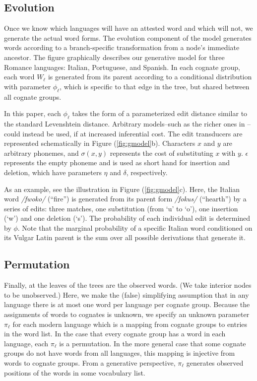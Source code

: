 \documentclass[11pt,a4paper]{article}
\begin{document}
\subsection{Evolution}

Once we know which languages will have an attested word and which
will not, we generate the actual word forms. The evolution component of
the model generates words according to a branch-specific transformation from a node's 
immediate ancestor.  The figure graphically describes our generative
model for three Romance languages: Italian, Portuguese, and Spanish.
In each cognate group, each word $W_\ell$ is generated from its
parent according to a conditional distribution with parameter $\phi_\ell$,
which is specific to that edge in the tree, but shared between all
cognate groups.

In this paper, each $\phi_\ell$ takes the form of a parameterized
edit distance similar to the standard Levenshtein distance.  Arbitrary
models--such as the richer ones in --could
instead be used, if at increased inferential cost.   The edit
transducers are represented schematically in Figure (\ref{fig:gmodel}b).
Characters $x$ and $y$ are arbitrary phonemes, and $\sigma(x,y)$
represents the cost of substituting $x$ with $y$.  $\epsilon$
represents the empty phoneme and is used as short hand for insertion
and deletion, which have parameters $\eta$ and $\delta$, respectively.

As an example, see the illustration in Figure (\ref{fig:gmodel}c).
Here, the Italian word \textit{/fwoko/} (``fire'') is generated from
its parent form \textit{/fokus/} (``hearth'') by a series of edits:
three matches, one substitution (from `u' to `o'), one insertion (`w') and
one deletion (`s').  The probability of each individual edit is
determined by $\phi$.  Note that the marginal probability of a
specific Italian word conditioned on its Vulgar Latin parent is the
sum over all possible derivations that generate it.

\subsection{Permutation}

Finally, at the leaves of the trees are the observed words. (We
take interior nodes to be unobserved.) Here, we make the (false)
simplifying assumption that in any language there is at most one
word per language per cognate group. Because the assignments of
words to cognates is unknown, we specify an unknown parameter
$\pi_\ell$ for each modern language which is a mapping from cognate
groups to entries in the word list. In the case that every cognate
group has a word in each language, each $\pi_\ell$ is a permutation.
In the more general case that some cognate groups do not have words
from all languages, this mapping is injective from words to cognate
groups. From a generative perspective, $\pi_\ell$ generates observed
positions of the words in some vocabulary list.
\end{document}
